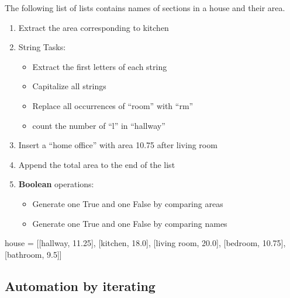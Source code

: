 \documentclass[
  letterpaper,
  DIV=11,
  numbers=noendperiod]{scrreprt}
\newenvironment{Shaded}{\begin{snugshade}}{\end{snugshade}}
\newcommand{\FloatTok}[1]{\textcolor[rgb]{0.68,0.00,0.00}{#1}}
\newcommand{\NormalTok}[1]{\textcolor[rgb]{0.00,0.23,0.31}{#1}}
\newcommand{\OperatorTok}[1]{\textcolor[rgb]{0.37,0.37,0.37}{#1}}
\newcommand{\StringTok}[1]{\textcolor[rgb]{0.13,0.47,0.30}{#1}}
\providecommand{\tightlist}{%
  \setlength{\itemsep}{0pt}\setlength{\parskip}{0pt}}\usepackage{longtable,booktabs,array}
\begin{document}
The following list of lists contains names of sections in a house and
their area.

\begin{enumerate}
\def\labelenumi{\arabic{enumi}.}
\tightlist
\item
  Extract the area corresponding to kitchen
\item
  String Tasks:

  \begin{itemize}
  \tightlist
  \item
    Extract the first letters of each string
  \item
    Capitalize all strings
  \item
    Replace all occurrences of ``room'' with ``rm''
  \item
    count the number of ``l'' in ``hallway''
  \end{itemize}
\item
  Insert a ``home office'' with area 10.75 after living room
\item
  Append the total area to the end of the list
\item
  \textbf{Boolean} operations:

  \begin{itemize}
  \tightlist
  \item
    Generate one True and one False by comparing areas
  \item
    Generate one True and one False by comparing names
  \end{itemize}
\end{enumerate}

\begin{Shaded}
\begin{Highlighting}[]
\NormalTok{house }\OperatorTok{=}\NormalTok{ [[}\StringTok{\textquotesingle{}hallway\textquotesingle{}}\NormalTok{, }\FloatTok{11.25}\NormalTok{],}
\NormalTok{ [}\StringTok{\textquotesingle{}kitchen\textquotesingle{}}\NormalTok{, }\FloatTok{18.0}\NormalTok{],}
\NormalTok{ [}\StringTok{\textquotesingle{}living room\textquotesingle{}}\NormalTok{, }\FloatTok{20.0}\NormalTok{],}
\NormalTok{ [}\StringTok{\textquotesingle{}bedroom\textquotesingle{}}\NormalTok{, }\FloatTok{10.75}\NormalTok{],}
\NormalTok{ [}\StringTok{\textquotesingle{}bathroom\textquotesingle{}}\NormalTok{, }\FloatTok{9.5}\NormalTok{]]}
\end{Highlighting}
\end{Shaded}

\hypertarget{automation-by-iterating}{%
\subsection{Automation by iterating}\label{automation-by-iterating}}
\end{document}

